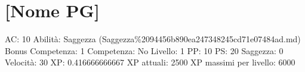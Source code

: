 \section{{[}Nome PG{]}}\label{nome-pg}

AC: 10 Abilità: Saggezza
(Saggezza\%2094456b890ea247348245cd71e07484ad.md) Bonus Competenza: 1
Competenza: No Livello: 1 PP: 10 PS: 20 Saggezza: 0 Velocità: 30 XP:
0.416666666667 XP attuali: 2500 XP massimi per livello: 6000
